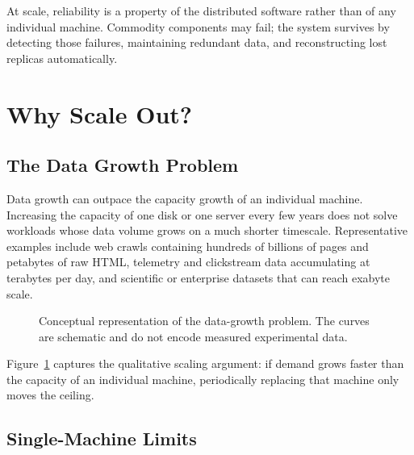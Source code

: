 \documentclass[11pt,a4paper,oneside]{book}
\begin{document}
\begin{keyconcept}
At scale, reliability is a property of the distributed software rather than of any individual machine. Commodity components may fail; the system survives by detecting those failures, maintaining redundant data, and reconstructing lost replicas automatically.
\end{keyconcept}

\section{Why Scale Out?}

\subsection{The Data Growth Problem}

Data growth can outpace the capacity growth of an individual machine. Increasing the capacity of one disk or one server every few years does not solve workloads whose data volume grows on a much shorter timescale. Representative examples include web crawls containing hundreds of billions of pages and petabytes of raw HTML, telemetry and clickstream data accumulating at terabytes per day, and scientific or enterprise datasets that can reach exabyte scale.

\begin{figure}[htbp]
\centering
{}
\caption{Conceptual representation of the data-growth problem. The curves are schematic and do not encode measured experimental data.}
\label{fig:data-growth}
\end{figure}

Figure~\ref{fig:data-growth} captures the qualitative scaling argument: if demand grows faster than the capacity of an individual machine, periodically replacing that machine only moves the ceiling.

\subsection{Single-Machine Limits}
\end{document}
